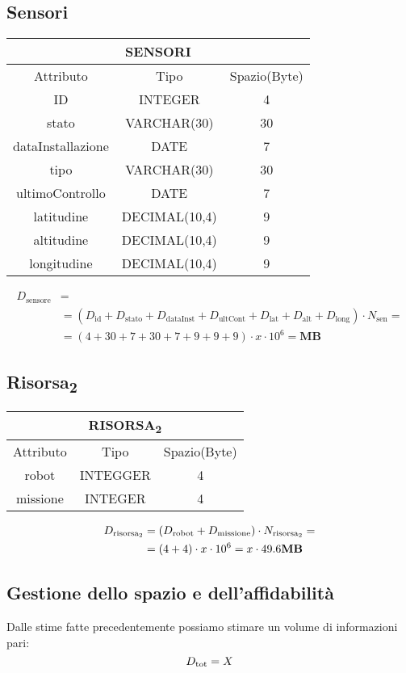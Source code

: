 \subsection{Sensori}
\begin{tabular}{ |c|c|c|}
  \hline
  \multicolumn{3}{|c|}{\textbf{SENSORI}}\\
  \hline
  Attributo & Tipo & Spazio(Byte) \\
  \hline
  ID & INTEGER & 4 \\
  stato & VARCHAR(30) & 30\\
  dataInstallazione & DATE & 7\\
  tipo & VARCHAR(30) & 30\\
  ultimoControllo & DATE & 7\\
  latitudine & DECIMAL(10,4) & 9\\
  altitudine & DECIMAL(10,4) & 9\\
  longitudine & DECIMAL(10,4) & 9\\
  \hline
\end{tabular}
\begin{equation}
  \begin{aligned}
    D_{\text{sensore}} &=\\
    &=(D_{\text{id}}+D_{\text{stato}}+D_{\text{dataInst}}+D_{\text{ultCont}}+D_{\text{lat}}+D_{\text{alt}}+D_{\text{long}})\cdot N_{\text{sen}}=\\
    &=(4+30+7+30+7+9+9+9)\cdot x\cdot 10^6= \textbf{MB}
  \end{aligned}
\end{equation}
\subsection{Risorsa\textsubscript{2}}
\begin{tabular}{|c|c|c|}
  \hline
  \multicolumn{3}{|c|}{\textbf{RISORSA\textsubscript{2}}}\\
  \hline
  Attributo & Tipo & Spazio(Byte) \\
  \hline
  robot & INTEGGER & 4 \\
  missione & INTEGER & 4 \\
  \hline
\end{tabular}
\begin{equation}
  \begin{aligned}
    D_{\text{risorsa\textsubscript{2}}}&=(D_{\text{robot}} + D_{\text{missione}}) \cdot N_{\text{risorsa\textsubscript{2}}}=\\
    &=(4+4)\cdot x\cdot 10^6=x\cdot 49.6  \text{\textbf{MB}}\\
  \end{aligned}
\end{equation}
\subsection{Gestione dello spazio e dell'affidabilità}
Dalle stime fatte precedentemente possiamo stimare un volume di informazioni pari:
\begin{equation}
  D_{\text{tot}}=X\\
\end{equation}


